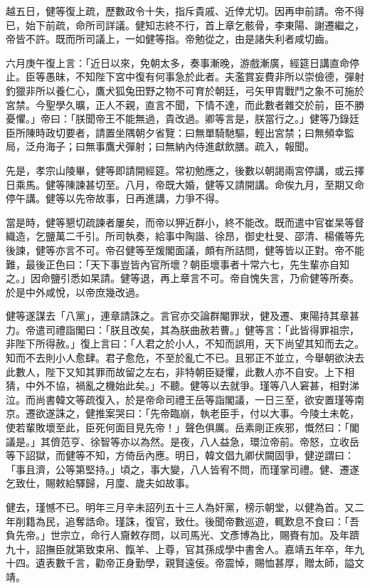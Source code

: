 \begin{pinyinscope}
越五日，健等復上疏，歷數政令十失，指斥貴戚、近倖尤切。因再申前請。帝不得已，始下前疏，命所司詳議。健知志終不行，首上章乞骸骨，李東陽、謝遷繼之，帝皆不許。既而所司議上，一如健等指。帝勉從之，由是諸失利者咸切齒。

六月庚午復上言：「近日以來，免朝太多，奏事漸晚，游戲漸廣，經筵日講直命停止。臣等愚昧，不知陛下宮中復有何事急於此者。夫濫賞妄費非所以崇儉德，彈射釣獵非所以養仁心，鷹犬狐兔田野之物不可育於朝廷，弓矢甲胄戰鬥之象不可施於宮禁。今聖學久曠，正人不親，直言不聞，下情不達，而此數者雜交於前，臣不勝憂懼。」帝曰：「朕聞帝王不能無過，貴改過。卿等言是，朕當行之。」健等乃錄廷臣所陳時政切要者，請置坐隅朝夕省覽：曰無單騎馳驅，輕出宮禁；曰無頻幸監局，泛舟海子；曰無事鷹犬彈射；曰無納內侍進獻飲膳。疏入，報聞。

先是，孝宗山陵畢，健等即請開經筵。常初勉應之，後數以朝謁兩宮停講，或云擇日乘馬。健等陳諫甚切至。八月，帝既大婚，健等又請開講。命俟九月，至期又命停午講。健等以先帝故事，日再進講，力爭不得。

當是時，健等懇切疏諫者屢矣，而帝以狎近群小，終不能改。既而遣中官崔杲等督織造，乞鹽萬二千引。所司執奏，給事中陶諧、徐昂，御史杜旻、邵清、楊儀等先後諫，健等亦言不可。帝召健等至煖閣面議，頗有所詰問，健等皆以正對。帝不能難，最後正色曰：「天下事豈皆內官所壞？朝臣壞事者十常六七，先生輩亦自知之。」因命鹽引悉如杲請。健等退，再上章言不可。帝自愧失言，乃俞健等所奏。於是中外咸悅，以帝庶幾改過。

健等遂謀去「八黨」，連章請誅之。言官亦交論群閹罪狀，健及遷、東陽持其章甚力。帝遣司禮詣閣曰：「朕且改矣，其為朕曲赦若曹。」健等言：「此皆得罪祖宗，非陛下所得赦。」復上言曰：「人君之於小人，不知而誤用，天下尚望其知而去之。知而不去則小人愈肆。君子愈危，不至於亂亡不已。且邪正不並立，今舉朝欲決去此數人，陛下又知其罪而故留之左右，非特朝臣疑懼，此數人亦不自安。上下相猜，中外不協，禍亂之機始此矣。」不聽。健等以去就爭。瑾等八人窘甚，相對涕泣。而尚書韓文等疏復入，於是帝命司禮王岳等詣閣議，一日三至，欲安置瑾等南京。遷欲遂誅之，健推案哭曰：「先帝臨崩，執老臣手，付以大事。今陵土未乾，使若輩敗壞至此，臣死何面目見先帝！」聲色俱厲。岳素剛正疾邪，慨然曰：「閣議是。」其儕范亨、徐智等亦以為然。是夜，八人益急，環泣帝前。帝怒，立收岳等下詔獄，而健等不知，方倚岳內應。明日，韓文倡九卿伏闕固爭，健逆謂曰：「事且濟，公等第堅持。」頃之，事大變，八人皆宥不問，而瑾掌司禮。健、遷遂乞致仕，賜敕給驛歸，月廩、歲夫如故事。

健去，瑾憾不已。明年三月辛未詔列五十三人為奸黨，榜示朝堂，以健為首。又二年削籍為民，追奪誥命。瑾誅，復官，致仕。後聞帝數巡遊，輒歎息不食曰：「吾負先帝。」世宗立，命行人齎敕存問，以司馬光、文彥博為比，賜賚有加。及年躋九十，詔撫臣就第致束帛、餼羊、上尊，官其孫成學中書舍人。嘉靖五年卒，年九十四。遺表數千言，勸帝正身勤學，親賢遠佞。帝震悼，賜恤甚厚，贈太師，謚文靖。


\end{pinyinscope}
